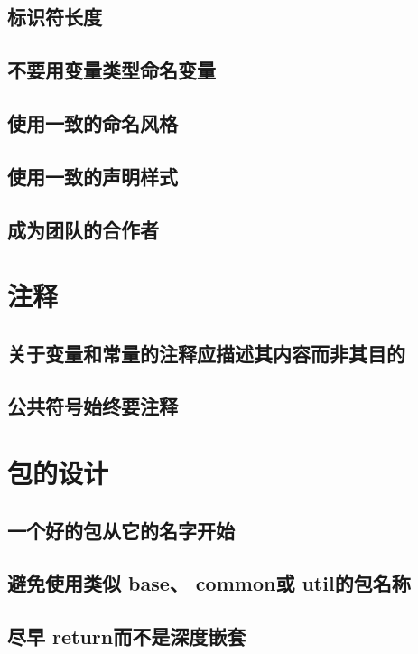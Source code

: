 \documentclass{paper}
\begin{document}
\subsection{标识符长度}

\subsection{不要用变量类型命名变量}

\subsection{使用一致的命名风格}

\subsection{使用一致的声明样式}

\subsection{成为团队的合作者}

\section{注释}

\subsection{关于变量和常量的注释应描述其内容而非其目的 }
\subsection{公共符号始终要注释}

\section{包的设计}

\subsection{一个好的包从它的名字开始}
\subsection{避免使用类似 base、 common或 util的包名称}
\subsection{尽早 return而不是深度嵌套}
\end{document}
